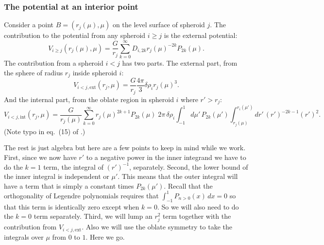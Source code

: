 \documentclass[amsmath,amsfonts,rmp,letterpaper]{revtex4}
\renewcommand{\inf}{\infty}
\newcommand{\ptk}{P_{2k}}
\newcommand{\sumonk}{\sum_{k=0}^{\inf}}
\newcommand{\dro}{\delta\rho}
\newcommand{\intonmu}{\int_{-1}^{1}}
\begin{document}
\subsubsection{The potential at an interior point}
Consider a point $B=(r_j(\mu),\mu)$ on the level surface of spheroid $j$. The
contribution to the potential from any spheroid $i\ge{j}$ is the external
potential:
\begin{equation}\label{eq:vigtj}
V_{i\ge{j}}(r_j(\mu),\mu) = \frac{G}{r_j}\sumonk{D_{i,2k}}r_j(\mu)^{-2k}\ptk(\mu).
\end{equation}
The contribution from a spheroid $i<j$ has two parts. The external part, from the
sphere of radius $r_j$ inside spheroid $i$:
\begin{equation}
V_{i<j,\mathrm{ext}}(r_j,\mu) = \frac{G}{r_j}\frac{4\pi}{3}\dro_i r_j(\mu)^3.
\end{equation}
And the internal part, from the oblate region in spheroid $i$ where $r'>r_j$:
\begin{equation}
V_{i<j,\mathrm{int}}(r_j,\mu) =
\frac{G}{r_j(\mu)}\sumonk{}r_j(\mu)^{2k+1}\ptk(\mu)\;
2\pi\,\dro_i\intonmu{d}\mu'\,\ptk(\mu')\int_{r_j(\mu)}^{r_i(\mu')}dr'\,
(r')^{-2k-1}(r')^2.
\end{equation}
(Note typo in eq.~(15) of \citep{Hubbard2013}.)

The rest is just algebra but here are a few points to keep in mind while we work.
First, since we now have $r'$ to a negative power in the inner integrand we have
to do the $k=1$ term, the integral of $(r')^{-1}$, separately. Second, the lower
bound of the inner integral is independent or $\mu'$. This means that the outer
integral will have a term that is simply a constant times $\ptk(\mu')$. Recall
that the orthogonality of Legendre polynomials requires that
$\int_{-1}^{1}P_{n>0}(x)\,dx=0$ so that this term is identically zero except when
$k=0$. So we will also need to do the $k=0$ term separately. Third, we will lump
an $r_j^2$ term together with the contribution from $V_{i<j,\mathrm{ext}}$. Also
we will use the oblate symmetry to take the integrals over $\mu$ from $0$ to $1$.
Here we go.
\end{document}
